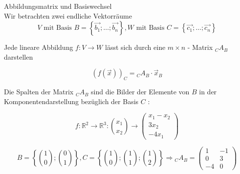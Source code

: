 \begin{KR}{Abbildungsmatrix und Basiswechsel}\\
    Wir betrachten zwei endliche Vektorräume
    $$
    V \text { mit Basis } B=\left\{\overrightarrow{b_{1}} ; \ldots ; \overrightarrow{b_{n}}\right\}, W \text { mit Basis } C=\left\{\overrightarrow{c_{1}} ; \ldots ; \overrightarrow{c_{n}}\right\}
    $$

    Jede lineare Abbildung $f: V \rightarrow W$ lässt sich durch eine $m \times n$ - Matrix ${ }_{C} A_{B}$ darstellen

    $$
    (f(\vec{x}))_{C}={ }_{C} A_{B} \cdot \vec{x}_{B}
    $$

    Die Spalten der Matrix ${ }_{C} A_{B}$ sind die Bilder der Elemente von $B$ in der Komponentendarstellung bezüglich der Basis $C$ :
    \begin{center}
    \end{center}
\end{KR}

\begin{example}
    $$
    f: \mathbb{R}^{2} \rightarrow \mathbb{R}^{3}:\binom{x_{1}}{x_{2}} \rightarrow\begin{pmatrix} x_{1}-x_{2} \\ 3 x_{2} \\ -4 x_{1} \end{pmatrix}
    $$

    $$
    B=\left\{\binom{1}{0} ; \binom{0}{1}\right\}, C=\left\{\binom{1}{0} ; \binom{1}{1} ; \binom{1}{2}\right\}
    \Rightarrow { }_{C} A_{B}=\begin{pmatrix} 1 & -1 \\ 0 & 3 \\ -4 & 0 \end{pmatrix}
    $$
\end{example}

